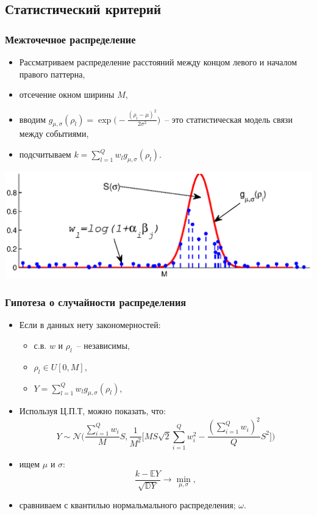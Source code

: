 \documentclass[smaller]{beamer}
\begin{document}
\subsection{Статистический критерий}
\begin{frame}
  \frametitle{Межточечное распределение}
  \begin{itemize}
   \item Рассматриваем распределение расстояний между концом левого и началом правого паттерна,
   \item отсечение окном ширины $M$,
   \item вводим $g_{\mu,\sigma}(\rho_l)=\exp\bigl(-\frac{(\rho_l-\mu)^2}{2\sigma^2}\bigr)$~-- это статистическая модель связи между событиями,
   \item подсчитываем $k=\sum_{l=1}^Q w_lg_{\mu,\sigma}(\rho_l).$
   \end{itemize}
   \includegraphics[scale=0.4]{weights.eps}
\end{frame}

\begin{frame}
  \frametitle{Гипотеза о случайности распределения}
  \begin{itemize}
    \item Если в данных нету закономерностей:
    \begin{itemize}
        \item  с.в. $w$ и $\rho_l$~-- независимы,
        \item  $\rho_l \in U[0,M]$,
        \item $Y=\sum_{l=1}^Qw_lg_{\mu,\sigma}(\rho_l)$, 
    \end{itemize}
    \item Используя Ц.П.Т, можно показать, что:
    $$Y\sim \mathcal{N}\biggl( \frac{\sum_{i=1}^Q w_i}MS, \frac1{M^2}\biggl[ MS\sqrt{2}\sum_{i=1}^Q w_i^2-\frac{(\sum_{i=1}^Q w_i)^2}QS^2 \biggr] \biggr)$$
    \item ищем $\mu$ и $\sigma$:
    $$\frac{k-\mathbb{E}Y}{\sqrt{\mathbb{D}Y}}\to\min_{\mu,\sigma},$$
    \item сравниваем с квантилью нормальмального распределения; $\omega$.
   \end{itemize}
\end{frame}
\end{document}
